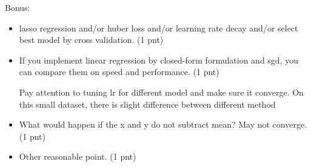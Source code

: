 \documentclass[12pt]{article}
\begin{document}
Bonus:
\begin{itemize}
	\item
		  lasso regression and/or huber loss and/or learning rate decay and/or select best model by cross validation. 
		  (1 pnt)
	\item
		  If you implement linear  regression by  closed-form formulation and sgd, you can compare them on speed and performance. (1 pnt) 

		  Pay attention to tuning lr for different model and make sure it converge.  On this small dataset, there is slight difference between different method 
	\item  What would happen if the x and y do not subtract mean? 
		May not converge. (1 pnt)
		\item Other reasonable point. (1 pnt)
\end{itemize}
\end{document}
